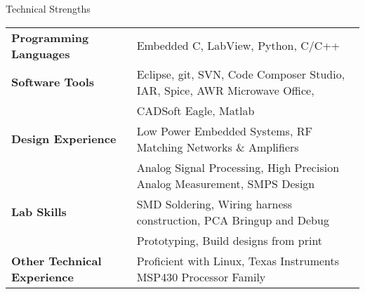 \documentclass{resume} %
\begin{document}

\begin{rSection}{Technical Strengths}

\begin{tabular}{ @{} >{\bfseries}l @{\hspace{6ex}} l }
Programming Languages & Embedded C, LabView, Python, C/C++  \smallskip \\

Software Tools & Eclipse, git, SVN, Code Composer Studio, IAR, Spice, AWR Microwave Office, \\
 & CADSoft Eagle, Matlab \smallskip \\

Design Experience & Low Power Embedded Systems, RF Matching Networks \& Amplifiers\\
 & Analog Signal Processing, High Precision Analog Measurement, SMPS Design \smallskip \\
 
Lab Skills & SMD Soldering, Wiring harness construction, PCA Bringup and Debug\\
 & Prototyping, Build designs from print\smallskip \\
 
Other Technical Experience & Proficient with Linux, Texas Instruments MSP430 Processor Family \\
\end{tabular}

\end{rSection}
\medskip
\end{document}
